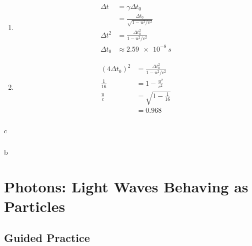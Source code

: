 \documentclass{article}
\begin{document}
\setcounter{subsubsection}{64}
\subsubsection{}

\begin{enumerate}
  \item

        \begin{align*}
          \Delta t   & = \gamma \Delta t_0                       \\
                     & = \frac{\Delta t_0}{\sqrt{1 - u^2 / v^2}} \\
          \Delta t^2 & = \frac{\Delta t_0^2}{1 - u^2 / c^2}      \\
          \Delta t_0 & \approx \qty{2.59e-8}{s}
        \end{align*}

  \item

        \begin{align*}
          (4 \Delta t_0)^2 & = \frac{\Delta t_0^2}{1 - u^2 / c^2} \\
          \frac{1}{16}     & = 1 - \frac{u^2}{c^2}                \\
          \frac{u}{c}      & = \sqrt{1 - \frac{1}{16}}            \\
                           & = 0.968
        \end{align*}
\end{enumerate}

\setcounter{subsubsection}{70}
\subsubsection{}

c

\setcounter{subsubsection}{72}
\subsubsection{}

b

\section{Photons: Light Waves Behaving as Particles}

\subsection{Guided Practice}
\end{document}
